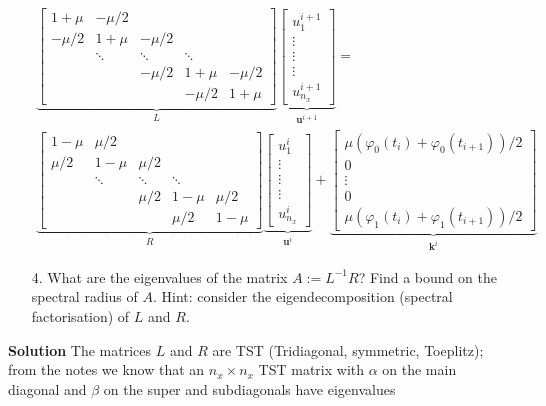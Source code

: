 \documentclass[12pt,a4paper]{article}
\begin{document}
\begin{eqnarray*}
&&
\underbrace{\begin{bmatrix}
1 + \mu & -\mu/2 & & & \\
-\mu/2  & 1+\mu & -\mu/2  & & \\
      & \ddots & \ddots & \ddots & \\
      &        & -\mu/2    & 1+ \mu & -\mu/2 \\
      &        &        &-\mu/2      & 1+\mu
\end{bmatrix}}_{L}
\underbrace{\begin{bmatrix}
u^{i+1}_{1} \\
\vdots \\
\vdots \\
\vdots \\
u^{i+1}_{n_x}
\end{bmatrix}}_{\mathbf{u}^{i+1}} = \\
&& 
\underbrace{\begin{bmatrix}
1 - \mu & \mu/2 & & & \\
\mu/2  & 1-\mu & \mu/2  & & \\
      & \ddots & \ddots & \ddots & \\
      &        & \mu/2    & 1- \mu & \mu/2 \\
      &        &        &\mu/2      & 1-\mu
\end{bmatrix}}_{R}
\underbrace{\begin{bmatrix}
u^{i}_{1} \\
\vdots \\
\vdots \\
\vdots \\
u^{i}_{n_x}
\end{bmatrix}}_{\mathbf{u}^i}
+
\underbrace{\begin{bmatrix}
\mu(\varphi_0(t_i) + \varphi_0(t_{i+1}))/2 \\
0 \\
\vdots \\
0 \\
\mu(\varphi_1(t_i) + \varphi_1(t_{i+1}))/2
\end{bmatrix}}_{\mathbf{k}^i}
\end{eqnarray*}
\begin{itemize}
\item[4. ] What are the eigenvalues of the matrix $A := L^{-1}R$? Find a bound on the spectral radius of $A$.   Hint: consider the eigendecomposition (spectral factorisation) of $L$ and $R$.

\end{itemize}
\textbf{Solution} The matrices $L$ and $R$ are TST (Tridiagonal, symmetric, Toeplitz); from the notes we know that an $n_x \times n_x$ TST matrix with $\alpha$ on the main diagonal and $\beta$ on the super and subdiagonals have eigenvalues 
\end{document}
